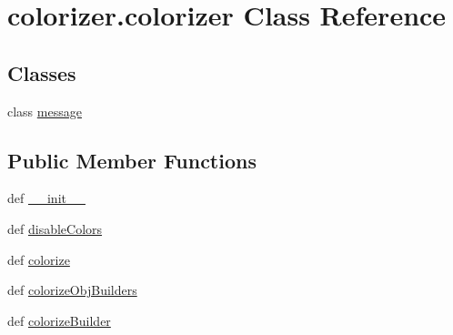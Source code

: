 \hypertarget{classcolorizer_1_1colorizer}{\section{colorizer.\-colorizer Class Reference}
\label{classcolorizer_1_1colorizer}
}
\subsection*{Classes}
\begin{DoxyCompactItemize}
\item 
class \hyperlink{classcolorizer_1_1colorizer_1_1message}{message}
\end{DoxyCompactItemize}
\subsection*{Public Member Functions}
\begin{DoxyCompactItemize}
\item 
def \hyperlink{classcolorizer_1_1colorizer_af10d252307774198b6979329e4b3a159}{\-\_\-\-\_\-init\-\_\-\-\_\-}
\item 
def \hyperlink{classcolorizer_1_1colorizer_ab65660e26d33d8b1bda58b8e30966012}{disable\-Colors}
\item 
def \hyperlink{classcolorizer_1_1colorizer_aab80d318413a2b8c6e94d08f4605df68}{colorize}
\item 
def \hyperlink{classcolorizer_1_1colorizer_a7a6d0a709b02484e1a79951a44d395ec}{colorize\-Obj\-Builders}
\item 
def \hyperlink{classcolorizer_1_1colorizer_a953d860484b65d508ba42820864be2e9}{colorize\-Builder}
\end{DoxyCompactItemize}
